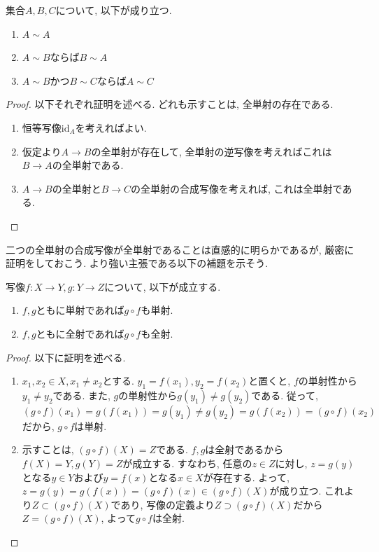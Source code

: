 \documentclass[a4j,dvipdfmx]{jsarticle}
\numberwithin{equation}{section}
\begin{document}
                集合$A,B,C$について, 以下が成り立つ.
                \begin{enumerate}\renewcommand{\labelenumi}{(\arabic{enumi})}
                    \item $A\sim A$
                    \item $A\sim B$ならば$B\sim A$
                    \item $A\sim B$かつ$B\sim C$ならば$A\sim C$
                \end{enumerate}
                \begin{proof}以下それぞれ証明を述べる. どれも示すことは, 全単射の存在である.
                    \begin{enumerate}\renewcommand{\labelenumi}{(\arabic{enumi})}
                        \item 恒等写像$\mathrm{id}_A$を考えればよい.
                        \item 仮定より$A\rightarrow B$の全単射が存在して, 全単射の逆写像を考えればこれは$B\rightarrow A$の全単射である.
                        \item $A\rightarrow B$の全単射と$B\rightarrow C$の全単射の合成写像を考えれば, これは全単射である.
                    \end{enumerate}
                \end{proof}
                二つの全単射の合成写像が全単射であることは直感的に明らかであるが, 厳密に証明をしておこう. より強い主張である以下の補題を示そう.
                \begin{screen}
                    写像$f:X\rightarrow Y,g:Y\rightarrow Z$について, 以下が成立する.
                    \begin{enumerate}\renewcommand{\labelenumi}{(\roman{enumi})}
                        \item $f,g$ともに単射であれば$g\circ f$も単射.
                        \item $f,g$ともに全射であれば$g\circ f$も全射.
                    \end{enumerate}
                \end{screen}
                \begin{proof}以下に証明を述べる.
                    \begin{enumerate}\renewcommand{\labelenumi}{(\roman{enumi})}
                        \item $x_1,x_2\in X,x_1\neq x_2$とする. $y_1=f(x_1),y_2=f(x_2)$と置くと, $f$の単射性から$y_1\neq y_2$である. また, $g$の単射性から$g(y_1)\neq g(y_2)$である. 
                        従って, $(g\circ f)(x_1)=g(f(x_1))=g(y_1)\neq g(y_2)=g(f(x_2))=(g\circ f)(x_2)$だから, $g\circ f$は単射.
                        \item 示すことは, $(g\circ f)(X)=Z$である. $f,g$は全射であるから$f(X)=Y,g(Y)=Z$が成立する. すなわち, 任意の$z\in Z$に対し, $z=g(y)$となる$y\in Y$および$y=f(x)$となる$x\in X$が存在する.
                        よって, $z=g(y)=g(f(x))=(g\circ f)(x)\in (g\circ f)(X)$が成り立つ. これより$Z\subset (g\circ f)(X)$であり, 写像の定義より$Z\supset (g\circ f)(X)$だから$Z=(g\circ f)(X)$, よって$g\circ f$は全射.
                    \end{enumerate}
                \end{proof}
\end{document}
